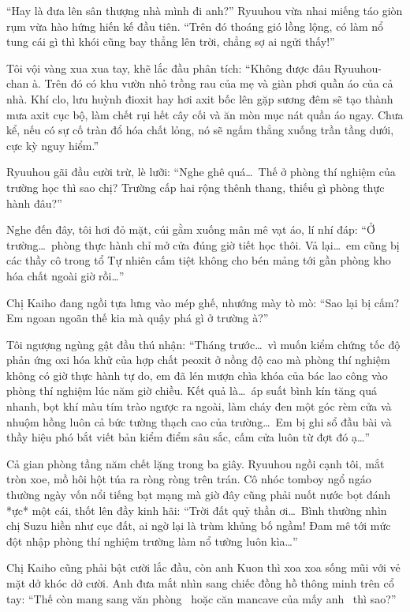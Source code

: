 \documentclass[../main.tex]{subfiles}
\begin{document}
``Hay là đưa lên sân thượng nhà mình đi anh?'' Ryuuhou vừa nhai miếng táo giòn rụm vừa hào hứng hiến kế đầu tiên. ``Trên đó thoáng gió lồng lộng, có làm nổ tung cái gì thì khói cũng bay thẳng lên trời, chẳng sợ ai ngửi thấy!''

Tôi vội vàng xua xua tay, khẽ lắc đầu phân tích: ``Không được đâu Ryuuhou-chan à. Trên đó có khu vườn nhỏ trồng rau của mẹ và giàn phơi quần áo của cả nhà. Khí clo, lưu huỳnh đioxit hay hơi axit bốc lên gặp sương đêm sẽ tạo thành mưa axit cục bộ, làm chết rụi hết cây cối và ăn mòn mục nát quần áo ngay. Chưa kể, nếu có sự cố tràn đổ hóa chất lỏng, nó sẽ ngấm thẳng xuống trần tầng dưới, cực kỳ nguy hiểm.''

Ryuuhou gãi đầu cười trừ, lè lưỡi: ``Nghe ghê quá\dots\ Thế ở phòng thí nghiệm của trường học thì sao chị? Trường cấp hai rộng thênh thang, thiếu gì phòng thực hành đâu?''

Nghe đến đây, tôi hơi đỏ mặt, cúi gằm xuống mân mê vạt áo, lí nhí đáp: ``Ở trường\dots\ phòng thực hành chỉ mở cửa đúng giờ tiết học thôi. Vả lại\dots\ em cũng bị các thầy cô trong tổ Tự nhiên cấm tiệt không cho bén mảng tới gần phòng kho hóa chất ngoài giờ rồi\dots''

Chị Kaiho đang ngồi tựa lưng vào mép ghế, nhướng mày tò mò: ``Sao lại bị cấm? Em ngoan ngoãn thế kia mà quậy phá gì ở trường à?''

Tôi ngượng ngùng gật đầu thú nhận: ``Tháng trước\dots\ vì muốn kiểm chứng tốc độ phản ứng oxi hóa khử của hợp chất peoxit ở nồng độ cao mà phòng thí nghiệm không có giờ thực hành tự do, em đã lén mượn chìa khóa của bác lao công vào phòng thí nghiệm lúc năm giờ chiều. Kết quả là\dots\ áp suất bình kín tăng quá nhanh, bọt khí màu tím trào ngược ra ngoài, làm cháy đen một góc rèm cửa và nhuộm hồng luôn cả bức tường thạch cao của trường\dots\ Em bị ghi sổ đầu bài và thầy hiệu phó bắt viết bản kiểm điểm sâu sắc, cấm cửa luôn từ đợt đó ạ\dots''

Cả gian phòng tầng năm chết lặng trong ba giây. Ryuuhou ngồi cạnh tôi, mắt tròn xoe, mồ hôi hột túa ra ròng ròng trên trán. Cô nhóc tomboy ngổ ngáo thường ngày vốn nổi tiếng bạt mạng mà giờ đây cũng phải nuốt nước bọt đánh *ực* một cái, thốt lên đầy kinh hãi: ``Trời đất quỷ thần ơi\dots\ Bình thường nhìn chị Suzu hiền như cục đất, ai ngờ lại là trùm khủng bố ngầm! Đam mê tới mức đột nhập phòng thí nghiệm trường làm nổ tường luôn kìa\dots''

Chị Kaiho cũng phải bật cười lắc đầu, còn anh Kuon thì xoa xoa sống mũi với vẻ mặt dở khóc dở cười. Anh đưa mắt nhìn sang chiếc đồng hồ thông minh trên cổ tay: ``Thế còn mang sang văn phòng \hll\ hoặc căn mancave của mấy anh \hls\ thì sao?''
\end{document}
